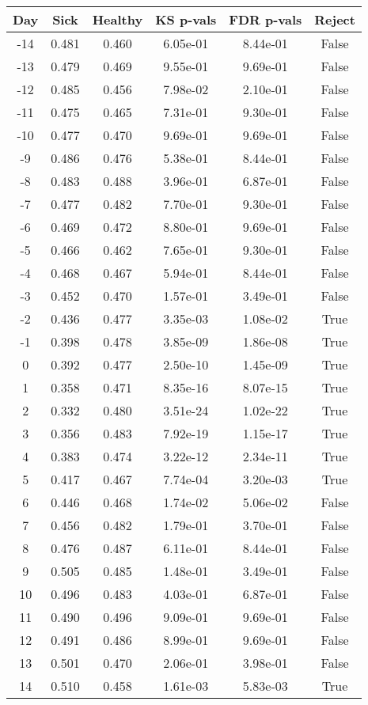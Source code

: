 \begin{tabular}{c|c|c|c|c|c}
Day &  Sick & Healthy &  KS p-vals & FDR p-vals & Reject\\
\hline
-14 & 0.481 &   0.460 &   6.05e-01 &   8.44e-01 &  False\\
-13 & 0.479 &   0.469 &   9.55e-01 &   9.69e-01 &  False\\
-12 & 0.485 &   0.456 &   7.98e-02 &   2.10e-01 &  False\\
-11 & 0.475 &   0.465 &   7.31e-01 &   9.30e-01 &  False\\
-10 & 0.477 &   0.470 &   9.69e-01 &   9.69e-01 &  False\\
 -9 & 0.486 &   0.476 &   5.38e-01 &   8.44e-01 &  False\\
 -8 & 0.483 &   0.488 &   3.96e-01 &   6.87e-01 &  False\\
 -7 & 0.477 &   0.482 &   7.70e-01 &   9.30e-01 &  False\\
 -6 & 0.469 &   0.472 &   8.80e-01 &   9.69e-01 &  False\\
 -5 & 0.466 &   0.462 &   7.65e-01 &   9.30e-01 &  False\\
 -4 & 0.468 &   0.467 &   5.94e-01 &   8.44e-01 &  False\\
 -3 & 0.452 &   0.470 &   1.57e-01 &   3.49e-01 &  False\\
 -2 & 0.436 &   0.477 &   3.35e-03 &   1.08e-02 &   True\\
 -1 & 0.398 &   0.478 &   3.85e-09 &   1.86e-08 &   True\\
  0 & 0.392 &   0.477 &   2.50e-10 &   1.45e-09 &   True\\
  1 & 0.358 &   0.471 &   8.35e-16 &   8.07e-15 &   True\\
  2 & 0.332 &   0.480 &   3.51e-24 &   1.02e-22 &   True\\
  3 & 0.356 &   0.483 &   7.92e-19 &   1.15e-17 &   True\\
  4 & 0.383 &   0.474 &   3.22e-12 &   2.34e-11 &   True\\
  5 & 0.417 &   0.467 &   7.74e-04 &   3.20e-03 &   True\\
  6 & 0.446 &   0.468 &   1.74e-02 &   5.06e-02 &  False\\
  7 & 0.456 &   0.482 &   1.79e-01 &   3.70e-01 &  False\\
  8 & 0.476 &   0.487 &   6.11e-01 &   8.44e-01 &  False\\
  9 & 0.505 &   0.485 &   1.48e-01 &   3.49e-01 &  False\\
 10 & 0.496 &   0.483 &   4.03e-01 &   6.87e-01 &  False\\
 11 & 0.490 &   0.496 &   9.09e-01 &   9.69e-01 &  False\\
 12 & 0.491 &   0.486 &   8.99e-01 &   9.69e-01 &  False\\
 13 & 0.501 &   0.470 &   2.06e-01 &   3.98e-01 &  False\\
 14 & 0.510 &   0.458 &   1.61e-03 &   5.83e-03 &   True\\
\end{tabular}
